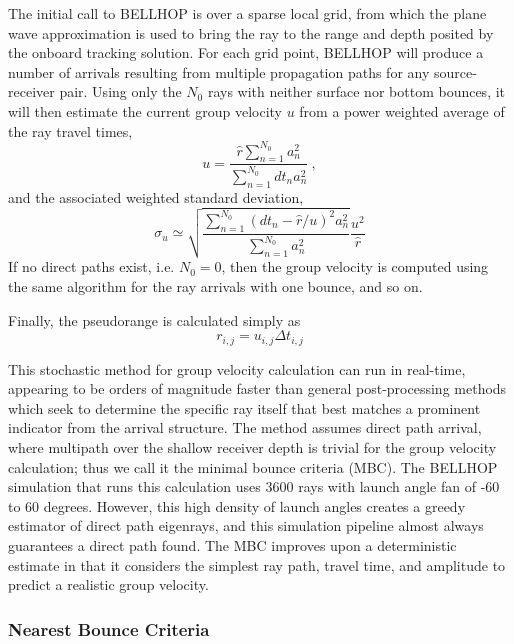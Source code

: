 The initial call to BELLHOP is over a sparse local grid, from which the plane wave approximation is used to bring the ray to the range and depth posited by the onboard tracking solution.
For each grid point, BELLHOP will produce a number of arrivals resulting from multiple propagation paths for any source-receiver pair.
Using only the $N_0$ rays with neither surface nor bottom bounces, it will then estimate the current group velocity $u$ from a power weighted average of the ray travel times,
\begin{equation}
u = \frac{\hat{r} \sum_{n=1}^{N_{0}} a_{n}^{2}}{\sum_{n=1}^{N_{0}} dt_{n}a_{n}^{2}} ~, 
\end{equation}
and the associated weighted standard deviation,
\begin{equation}
\sigma_{u} \simeq \sqrt{\frac {\sum_{n=1}^{N_{0}} (dt_{n}-\hat{r}/u)^{2}a_{n}^{2}}{ \sum_{n=1}^{N_{0}} a_{n}^{2}} } \frac{u^{2}}{\hat{r}}
\end{equation}
If no direct paths exist, i.e. $N_{0}=0$, then the group velocity is computed using the same algorithm for the ray arrivals with one bounce, and so on.

Finally, the pseudorange is calculated simply as
\begin{equation}
r_{i,j} = u_{i,j} \Delta t_{i,j} 
\end{equation}

This stochastic method for group velocity calculation can run in real-time, appearing to be orders of magnitude faster than general post-processing methods which seek to determine the specific ray itself that best matches a prominent indicator from the arrival structure.
The method assumes direct path arrival, where multipath over the shallow receiver depth is trivial for the group velocity calculation; thus we call it the minimal bounce criteria (MBC).
The BELLHOP simulation that runs this calculation uses 3600 rays with launch angle fan of -60 to 60 degrees.
However, this high density of launch angles creates a greedy estimator of direct path eigenrays, and this simulation pipeline almost always guarantees a direct path found.
The MBC improves upon a deterministic estimate in that it considers the simplest ray path, travel time, and amplitude to predict a realistic group velocity.

\subsubsection{Nearest Bounce Criteria}

